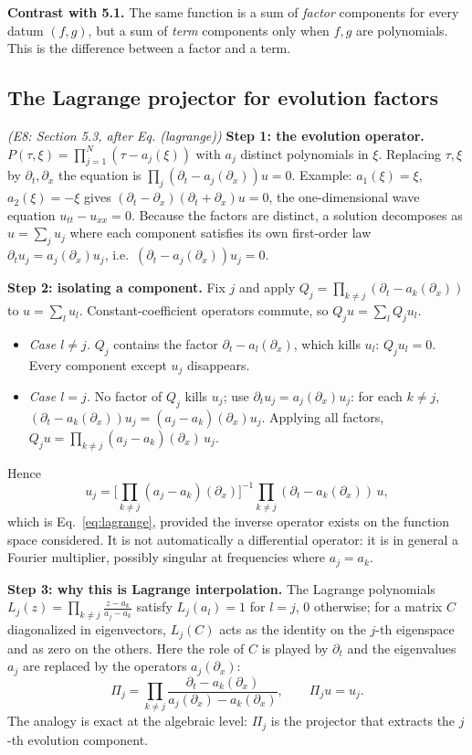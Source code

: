 \medskip\textbf{Contrast with 5.1.} The same function is a sum of \emph{factor} components for every datum $(f,g)$, but a sum of \emph{term} components only when $f,g$ are polynomials. This is the difference between a factor and a term.

\subsection{The Lagrange projector for evolution factors}\label{expl:E8}
\noindent\emph{(E8: Section 5.3, after Eq. (lagrange))}
\textbf{Step 1: the evolution operator.} $P(\tau,\xi)=\prod_{j=1}^N(\tau-a_j(\xi))$ with $a_j$ distinct polynomials in $\xi$. Replacing $\tau,\xi$ by $\partial_t,\partial_x$ the equation is $\prod_j(\partial_t-a_j(\partial_x))u=0$. Example: $a_1(\xi)=\xi$, $a_2(\xi)=-\xi$ gives $(\partial_t-\partial_x)(\partial_t+\partial_x)u=0$, the one-dimensional wave equation $u_{tt}-u_{xx}=0$. Because the factors are distinct, a solution decomposes as $u=\sum_ju_j$ where each component satisfies its own first-order law $\partial_tu_j=a_j(\partial_x)u_j$, i.e.\ $(\partial_t-a_j(\partial_x))u_j=0$.

\medskip\textbf{Step 2: isolating a component.} Fix $j$ and apply $Q_j=\prod_{k\ne j}(\partial_t-a_k(\partial_x))$ to $u=\sum_lu_l$. Constant-coefficient operators commute, so $Q_ju=\sum_lQ_ju_l$.
\begin{itemize}[nosep]
\item \emph{Case $l\ne j$.} $Q_j$ contains the factor $\partial_t-a_l(\partial_x)$, which kills $u_l$: $Q_ju_l=0$. Every component except $u_j$ disappears.
\item \emph{Case $l=j$.} No factor of $Q_j$ kills $u_j$; use $\partial_tu_j=a_j(\partial_x)u_j$: for each $k\ne j$, $(\partial_t-a_k(\partial_x))u_j=(a_j-a_k)(\partial_x)u_j$. Applying all factors, $Q_ju=\prod_{k\ne j}(a_j-a_k)(\partial_x)\,u_j$.
\end{itemize}
Hence
\[
u_j=\Big[\prod_{k\ne j}(a_j-a_k)(\partial_x)\Big]^{-1}\prod_{k\ne j}(\partial_t-a_k(\partial_x))\,u,
\]
which is Eq.~\eqref{eq:lagrange}, provided the inverse operator exists on the function space considered. It is not automatically a differential operator: it is in general a Fourier multiplier, possibly singular at frequencies where $a_j=a_k$.

\medskip\textbf{Step 3: why this is Lagrange interpolation.} The Lagrange polynomials $L_j(z)=\prod_{k\ne j}\frac{z-a_k}{a_j-a_k}$ satisfy $L_j(a_l)=1$ for $l=j$, $0$ otherwise; for a matrix $C$ diagonalized in eigenvectors, $L_j(C)$ acts as the identity on the $j$-th eigenspace and as zero on the others. Here the role of $C$ is played by $\partial_t$ and the eigenvalues $a_j$ are replaced by the operators $a_j(\partial_x)$:
\[
\Pi_j=\prod_{k\ne j}\frac{\partial_t-a_k(\partial_x)}{a_j(\partial_x)-a_k(\partial_x)},\qquad \Pi_ju=u_j .
\]
The analogy is exact at the algebraic level: $\Pi_j$ is the projector that extracts the $j$-th evolution component.


